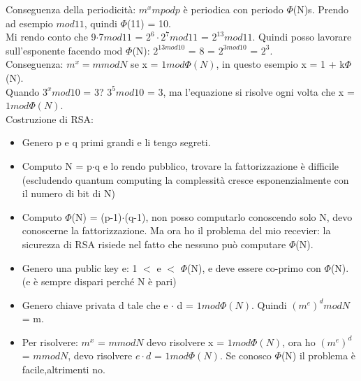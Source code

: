 \documentclass[16px]{article}
\begin{document}
Conseguenza della periodicità: $m^xmpodp$ è periodica con periodo $\Phi$(N)s. Prendo ad esempio $mod11$, quindi $\Phi$(11) = 10.\\ Mi rendo conto che 9$\cdot$7$mod11$ = $2^6 \cdot 2^7 mod11$ = $2^{13}mod11$. Quindi posso lavorare sull'esponente facendo mod $\Phi$(N): $2^{13mod10}$ = 8 = $2^{3mod10}$ = $2^3$.\\ Conseguenza: $m^x = m modN$ se x = $1 mod\Phi(N)$, in questo esempio x = 1 + k$\Phi$(N).\\ Quando $3^xmod10$ = 3? $3^5mod10$ = 3, ma l'equazione si risolve ogni volta che x = $1mod\Phi(N)$.\\ Costruzione di RSA:
\begin{itemize}
\item Genero p e q primi grandi e li tengo segreti.
\item Computo N = p$\cdot$q e lo rendo pubblico, trovare la fattorizzazione è difficile (escludendo quantum computing la complessità cresce esponenzialmente con il numero di bit di N)
\item Computo $\Phi$(N) = (p-1)$\cdot$(q-1), non posso computarlo conoscendo solo N, devo conoscerne la fattorizzazione. Ma ora ho il problema del mio recevier: la sicurezza di RSA risiede nel fatto che nessuno può computare $\Phi$(N).
\item Genero una public key e: 1 $<$ e $<$ $\Phi$(N), e deve essere co-primo con $\Phi$(N). (e è sempre dispari perché N è pari)
\item Genero chiave privata d tale che e $\cdot$ d = $1mod\Phi(N)$. Quindi $(m^{e})^dmodN$ = m.
\item Per risolvere: $m^x$ = $m mod N$ devo risolvere x = $1mod\Phi(N)$, ora ho $(m^e)^d$ = $m mod N$, devo risolvere $e \cdot d$ = $1 mod\Phi(N)$. Se conosco $\Phi$(N) il problema è facile,altrimenti no.
\end{itemize}
\end{document}
